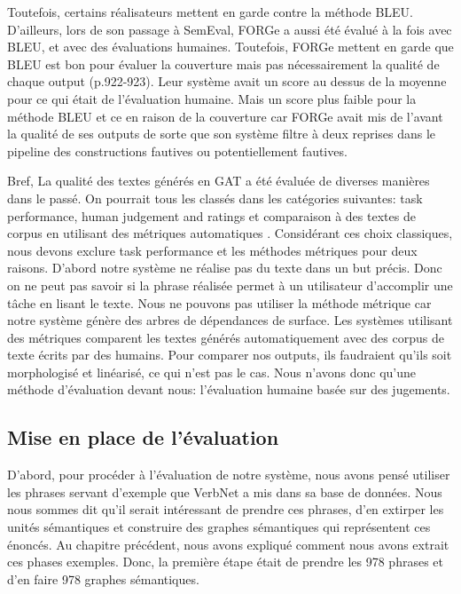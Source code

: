 Toutefois, certains réalisateurs mettent en garde contre la méthode BLEU. D'ailleurs, lors de son passage à SemEval, FORGe a aussi été évalué à la fois avec BLEU, et avec des évaluations humaines. Toutefois, FORGe mettent en garde que BLEU est bon pour évaluer la couverture mais pas nécessairement la qualité de chaque output (p.922-923). Leur système avait un score au dessus de la moyenne pour ce qui était de l'évaluation humaine. Mais un score plus faible pour la méthode BLEU et ce en raison de la couverture car FORGe avait mis de l'avant la qualité de ses outputs de sorte que son système filtre à deux reprises dans le pipeline des constructions fautives ou potentiellement fautives.

Bref, La qualité des textes générés en GAT a été évaluée de diverses manières dans le passé. On pourrait tous les classés dans les catégories suivantes: task performance, human judgement and ratings et comparaison à des textes de corpus en utilisant des métriques automatiques \citep{ReiterInvestigationValidityMetrics2009}. Considérant ces choix classiques, nous devons exclure task performance et les méthodes métriques pour deux raisons. D'abord notre système ne réalise pas du texte dans un but précis. Donc on ne peut pas savoir si la phrase réalisée permet à un utilisateur d'accomplir une tâche en lisant le texte. Nous ne pouvons pas utiliser la méthode métrique car notre système génère des arbres de dépendances de surface. Les systèmes utilisant des métriques comparent les textes générés automatiquement avec des corpus de texte écrits par des humains. Pour comparer nos outputs, ils faudraient qu'ils soit morphologisé et linéarisé, ce qui n'est pas le cas. Nous n'avons donc qu'une méthode d'évaluation devant nous: l'évaluation humaine basée sur des jugements.

\subsection{Mise en place de l'évaluation}
D'abord, pour procéder à l'évaluation de notre système, nous avons pensé utiliser les phrases servant d'exemple que VerbNet a mis dans sa base de données. Nous nous sommes dit qu'il serait intéressant de prendre ces phrases, d'en extirper les unités sémantiques et construire des graphes sémantiques qui représentent ces énoncés. Au chapitre précédent, nous avons expliqué comment nous avons extrait ces phases exemples. Donc, la première étape était de prendre les 978 phrases et d'en faire 978 graphes sémantiques.

